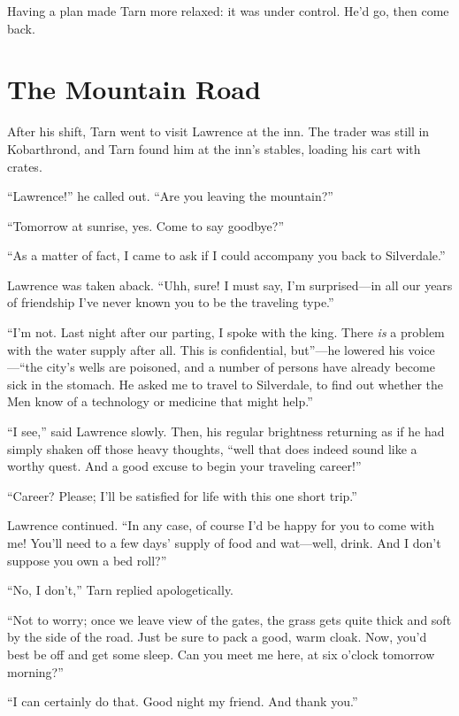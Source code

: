 Having a plan made Tarn more relaxed: it was under control.  He'd go, then come back.

\chapter{The Mountain Road}

After his shift, Tarn went to visit Lawrence at the inn.  The trader was still in Kobarthrond, and Tarn found him at the inn's stables, loading his cart with crates.

``Lawrence!'' he called out.  ``Are you leaving the mountain?''

``Tomorrow at sunrise, yes.  Come to say goodbye?''

``As a matter of fact, I came to ask if I could accompany you back to Silverdale.''

Lawrence was taken aback.  ``Uhh, sure!  I must say, I'm surprised---in all our years of friendship I've never known you to be the traveling type.''

``I'm not.  Last night after our parting, I spoke with the king.  There \emph{is} a problem with the water supply after all.  This is confidential, but''---he lowered his voice---``the city's wells are poisoned, and a number of persons have already become sick in the stomach.  He asked me to travel to Silverdale, to find out whether the Men know of a technology or medicine that might help.''

``I see,'' said Lawrence slowly.  Then, his regular brightness returning as if he had simply shaken off those heavy thoughts, ``well that does indeed sound like a worthy quest.  And a good excuse to begin your traveling career!''

``Career?  Please; I'll be satisfied for life with this one short trip.''

Lawrence continued.  ``In any case, of course I'd be happy for you to come with me!  You'll need to a few days' supply of food and wat---well, drink.  And I don't suppose you own a bed roll?''

``No, I don't,'' Tarn replied apologetically.

``Not to worry; once we leave view of the gates, the grass gets quite thick and soft by the side of the road.  Just be sure to pack a good, warm cloak.  Now, you'd best be off and get some sleep.  Can you meet me here, at six o'clock tomorrow morning?''

``I can certainly do that.  Good night my friend.  And thank you.''

